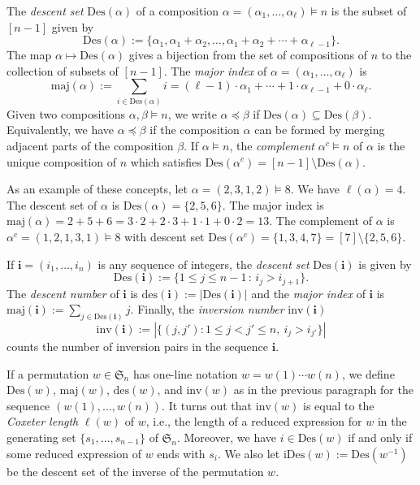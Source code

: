 \documentclass[ALCO,ThmDefs,published]{cedram}
\newcommand{\symm}{{\mathfrak{S}}}
\theoremstyle{plain}
\newcommand{\maj}{{\mathrm {maj}}}
\newcommand{\inv}{{\mathrm {inv}}}
\newcommand{\Des}{{\mathrm {Des}}}
\newcommand{\des}{{\mathrm {des}}}
\newcommand{\iDes}{{\mathrm {iDes}}}
\newcommand{\symm}{{\mathfrak{S}}}
\newcommand{\ii}{{\mathbf{i}}}
\begin{document}
The \emph{descent set} $\Des(\alpha)$ of a composition $\alpha = (\alpha_1, \dots, \alpha_{\ell}) \models n$ is the subset of $[n-1]$ given by
\begin{equation}
\Des(\alpha) := \{\alpha_1, \alpha_1 + \alpha_2, \dots, \alpha_1 + \alpha_2 + \cdots + \alpha_{\ell - 1} \}.
\end{equation}
The map $\alpha \mapsto \Des(\alpha)$ gives a bijection from the set of compositions of $n$ to the collection  
of subsets of $[n-1]$.
The \emph{major index} of $\alpha = (\alpha_1, \dots, \alpha_{\ell})$
is 
\begin{equation}
\maj(\alpha) := \sum_{i\in\Des(\alpha)} i = (\ell - 1) \cdot \alpha_1 + \cdots + 1 \cdot \alpha_{\ell-1} + 0 \cdot \alpha_{\ell}.
\end{equation}
Given two compositions $\alpha, \beta \models n$, we write $\alpha \preceq \beta$ if 
$\Des(\alpha) \subseteq \Des(\beta)$.  Equivalently, we have $\alpha \preceq \beta$ if the composition $\alpha$
can be formed by merging adjacent parts of the composition $\beta$.  
If $\alpha \models n$, the \emph{complement} $\alpha^c \models n$ of $\alpha$ is the unique composition of $n$
which satisfies $\Des(\alpha^c) = [n-1] \setminus \Des(\alpha)$.


As an example of these concepts, let $\alpha = (2,3,1,2) \models 8$.  We have $\ell(\alpha) = 4$. 
The descent set of $\alpha$ is $\Des(\alpha) = \{2,5,6\}$.
The major index is $\maj(\alpha) = 2+5+6 = 3 \cdot 2 + 2 \cdot 3 + 1 \cdot 1 + 0 \cdot 2 = 13$.
The complement of $\alpha$ is $\alpha^c = (1,2,1,3,1) \models 8$ with descent set $\Des(\alpha^c) = \{1,3,4,7\} = [7]\setminus\{2,5,6\}$.  



If $\ii = (i_1, \dots, i_n)$ is any sequence of  integers, the \emph{descent set}
$\Des(\ii)$ is given by
\begin{equation}
\Des(\ii) := \{1 \leq j \leq n-1 \,:\, i_j > i_{j+1} \}.
\end{equation}
The \emph{descent number} of $\ii$ is $\des(\ii) := |\Des(\ii)|$ and the \emph{major index} of $\ii$ is $\maj(\ii) := \sum_{j \in \Des(\ii)} j$.
Finally, the \emph{inversion number} $\inv(\ii)$ 
\begin{equation}
\inv(\ii) := | \{ (j,j') : 1\le j<j'\le n,\ i_j > i_{j'} \}|
\end{equation}
counts the number of inversion pairs in the sequence $\ii$.

If a permutation $w \in \symm_n$ has one-line notation $w = w(1) \cdots w(n)$, we define 
$\Des(w)$, $\maj(w)$, $\des(w)$, and $\inv(w)$ as in the previous paragraph for the sequence $(w(1),\ldots,w(n))$.
It turns out that $\inv(w)$ is equal to the \emph{Coxeter length} $\ell(w)$ of $w$, i.e., the length of
a reduced expression for $w$ in the generating set $\{s_1, \dots, s_{n-1}\}$ of 
$\symm_n$.
Moreover, we have $i\in\Des(w)$ if and only if some reduced expression of $w$ ends with $s_i$.
We also let $\iDes(w) := \Des(w^{-1})$ be the descent set of the inverse of the permutation $w$.
\end{document}
